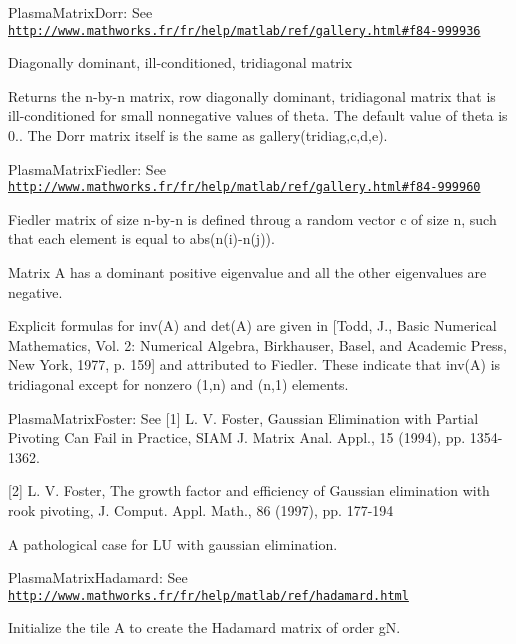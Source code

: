 \begin{DoxyItemize}
\item Plasma\+Matrix\+Dorr\+: See \href{http://www.mathworks.fr/fr/help/matlab/ref/gallery.html#f84-999936}{\tt http\+://www.\+mathworks.\+fr/fr/help/matlab/ref/gallery.\+html\#f84-\/999936}\end{DoxyItemize}
Diagonally dominant, ill-\/conditioned, tridiagonal matrix

Returns the n-\/by-\/n matrix, row diagonally dominant, tridiagonal matrix that is ill-\/conditioned for small nonnegative values of theta. The default value of theta is 0.. The Dorr matrix itself is the same as gallery(\textquotesingle{}tridiag\textquotesingle{},c,d,e).

\begin{DoxyItemize}
\item Plasma\+Matrix\+Fiedler\+: See \href{http://www.mathworks.fr/fr/help/matlab/ref/gallery.html#f84-999960}{\tt http\+://www.\+mathworks.\+fr/fr/help/matlab/ref/gallery.\+html\#f84-\/999960}\end{DoxyItemize}
Fiedler matrix of size n-\/by-\/n is defined throug a random vector c of size n, such that each element is equal to abs(n(i)-\/n(j)).

Matrix A has a dominant positive eigenvalue and all the other eigenvalues are negative.

Explicit formulas for inv(\+A) and det(\+A) are given in \mbox{[}Todd, J., Basic Numerical Mathematics, Vol. 2\+: Numerical Algebra, Birkhauser, Basel, and Academic Press, New York, 1977, p. 159\mbox{]} and attributed to Fiedler. These indicate that inv(\+A) is tridiagonal except for nonzero (1,n) and (n,1) elements.

\begin{DoxyItemize}
\item Plasma\+Matrix\+Foster\+: See \mbox{[}1\mbox{]} L. V. Foster, Gaussian Elimination with Partial Pivoting Can Fail in Practice, S\+I\+A\+M J. Matrix Anal. Appl., 15 (1994), pp. 1354-\/1362.\end{DoxyItemize}
\mbox{[}2\mbox{]} L. V. Foster, The growth factor and efficiency of Gaussian elimination with rook pivoting, J. Comput. Appl. Math., 86 (1997), pp. 177-\/194

A pathological case for L\+U with gaussian elimination.

\begin{DoxyItemize}
\item Plasma\+Matrix\+Hadamard\+: See \href{http://www.mathworks.fr/fr/help/matlab/ref/hadamard.html}{\tt http\+://www.\+mathworks.\+fr/fr/help/matlab/ref/hadamard.\+html}\end{DoxyItemize}
Initialize the tile A to create the Hadamard matrix of order g\+N.

